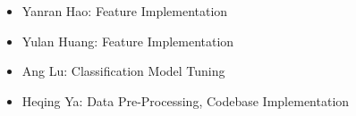 \begin{itemize}
\setlength{\itemsep}{4pt}
    \setlength{\parskip}{0pt}

\item Yanran Hao: Feature Implementation
\item Yulan Huang: Feature Implementation
\item Ang Lu: Classification Model Tuning
\item Heqing Ya: Data Pre-Processing, Codebase Implementation
\end{itemize}